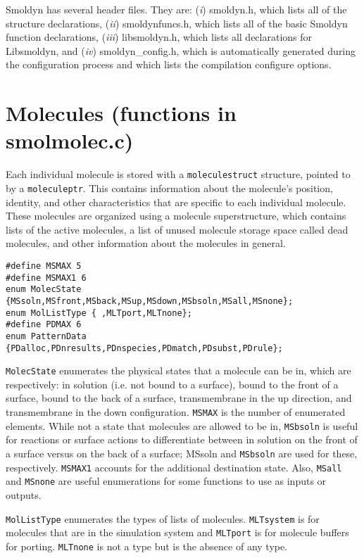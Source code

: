 \documentclass {book}
\begin{document}
Smoldyn has several header files.  They are: (\emph{i}) smoldyn.h, which lists all of the structure declarations, (\emph{ii}) smoldynfuncs.h, which lists all of the basic Smoldyn function declarations, (\emph{iii}) libsmoldyn.h, which lists all declarations for Libsmoldyn, and (\emph{iv}) smoldyn\_config.h, which is automatically generated during the configuration process and which lists the compilation configure options.

\section{Molecules (functions in smolmolec.c)}

Each individual molecule is stored with a \texttt{moleculestruct} structure, pointed to by a \texttt{moleculeptr}.  This contains information about the molecule's position, identity, and other characteristics that are specific to each individual molecule.  These molecules are organized using a molecule superstructure, which contains lists of the active molecules, a list of unused molecule storage space called dead molecules, and other information about the molecules in general.

\begin{lstlisting}
#define MSMAX 5
#define MSMAX1 6
enum MolecState {MSsoln,MSfront,MSback,MSup,MSdown,MSbsoln,MSall,MSnone};
enum MolListType { ,MLTport,MLTnone};
#define PDMAX 6
enum PatternData {PDalloc,PDnresults,PDnspecies,PDmatch,PDsubst,PDrule};
\end{lstlisting}

\texttt{MolecState} enumerates the physical states that a molecule can be in, which are respectively: in solution (i.e. not bound to a surface), bound to the front of a surface, bound to the back of a surface, transmembrane in the up direction, and transmembrane in the down configuration.  \texttt{MSMAX} is the number of enumerated elements.  While not a state that molecules are allowed to be in, \texttt{MSbsoln} is useful for reactions or surface actions to differentiate between in solution on the front of a surface versus on the back of a surface; MSsoln and \texttt{MSbsoln} are used for these, respectively.  \texttt{MSMAX1} accounts for the additional destination state.  Also, \texttt{MSall} and \texttt{MSnone} are useful enumerations for some functions to use as inputs or outputs.

\texttt{MolListType} enumerates the types of lists of molecules.  \texttt{MLTsystem} is for molecules that are in the simulation system and \texttt{MLTport} is for molecule buffers for porting.  \texttt{MLTnone} is not a type but is the absence of any type.
\end{document}
